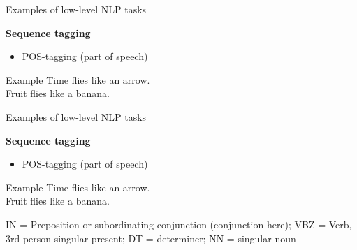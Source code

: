 \begin{vbframe}{Examples of low-level NLP tasks}


\textbf{Sequence tagging}

\begin{itemize}
	\item POS-tagging (part of speech)
\end{itemize}
	
\begin{exampleblock}{Example}
	Time flies   like   an   arrow.\\Fruit   flies   like   a   banana.
\end{exampleblock}

\vfill

\end{vbframe}


\begin{vbframe}{Examples of low-level NLP tasks}


\textbf{Sequence tagging}

\begin{itemize}
	\item POS-tagging (part of speech)
\end{itemize}

\begin{exampleblock}{Example}
		Time flies  like   an   arrow.		\\ Fruit\POS{NN}   flies   like   a   banana.
\end{exampleblock}

\begin{footnotesize}
IN = Preposition or subordinating conjunction (conjunction here); VBZ = Verb, 3rd person singular present; DT = determiner; NN = singular noun
\end{footnotesize}


\vfill

\end{vbframe}


